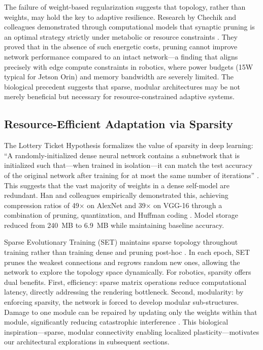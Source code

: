 \documentclass[12pt,a4paper,oneside]{report}
\begin{document}
The failure of weight-based regularization suggests that topology, rather than weights, may hold the key to adaptive resilience. Research by Chechik and colleagues demonstrated through computational models that synaptic pruning is an optimal strategy strictly under metabolic or resource constraints \cite{chechik1998synaptic}. They proved that in the absence of such energetic costs, pruning cannot improve network performance compared to an intact network---a finding that aligns precisely with edge compute constraints in robotics, where power budgets (15W typical for Jetson Orin) and memory bandwidth are severely limited. The biological precedent suggests that sparse, modular architectures may be not merely beneficial but necessary for resource-constrained adaptive systems.

\subsection{Resource-Efficient Adaptation via Sparsity}
The Lottery Ticket Hypothesis formalizes the value of sparsity in deep learning: ``A randomly-initialized dense neural network contains a subnetwork that is initialized such that---when trained in isolation---it can match the test accuracy of the original network after training for at most the same number of iterations'' \cite{frankle2018lottery}. This suggests that the vast majority of weights in a dense self-model are redundant. Han and colleagues empirically demonstrated this, achieving compression ratios of 49$\times$ on AlexNet and 39$\times$ on VGG-16 through a combination of pruning, quantization, and Huffman coding \cite{han2015deep}. Model storage reduced from 240~MB to 6.9~MB while maintaining baseline accuracy.

Sparse Evolutionary Training (SET) maintains sparse topology throughout training rather than training dense and pruning post-hoc \cite{mocanu2018scalable}. In each epoch, SET prunes the weakest connections and regrows random new ones, allowing the network to explore the topology space dynamically. For robotics, sparsity offers dual benefits. First, efficiency: sparse matrix operations reduce computational latency, directly addressing the rendering bottleneck. Second, modularity: by enforcing sparsity, the network is forced to develop modular sub-structures. Damage to one module can be repaired by updating only the weights within that module, significantly reducing catastrophic interference \cite{frankle2018lottery, mocanu2018scalable}. This biological inspiration---sparse, modular connectivity enabling localized plasticity---motivates our architectural explorations in subsequent sections.
\end{document}
